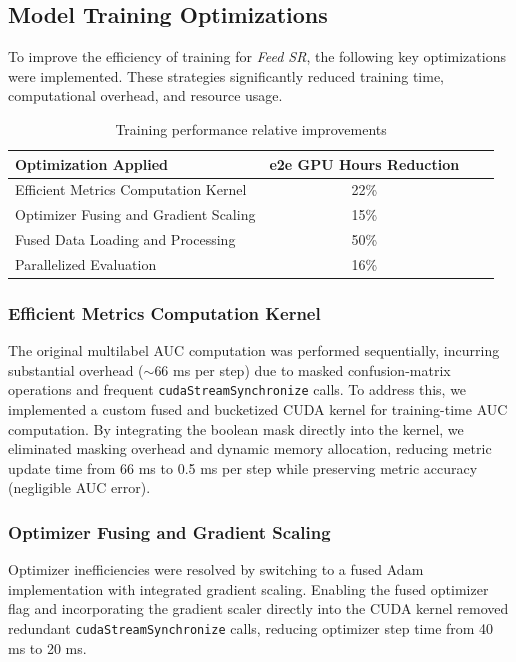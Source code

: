 \documentclass[sigconf]{acmart}
\newcommand{\systemname}{\textit{Feed SR}}
\begin{document}
\subsection{Model Training Optimizations}\label{sec:training-optimizations}

To improve the efficiency of training for {\systemname}, the following key optimizations were implemented. These strategies significantly reduced training time, computational overhead, and resource usage.

\begin{table}[ht]
\centering
\small %
\begin{tabular}{lccc}
\hline
\textbf{Optimization Applied} & \textbf{e2e GPU Hours Reduction}\\ \hline
Efficient Metrics Computation Kernel & 22\% \\
Optimizer Fusing and Gradient Scaling & 15\% \\ 
Fused Data Loading and Processing & 50\% \\ 
Parallelized Evaluation & 16\% \\ 
\hline
\end{tabular}
\caption{Training performance relative improvements}
\label{table:Training_optimizations_table}
\vspace{-2.5em}
\end{table}

\subsubsection{Efficient Metrics Computation Kernel}
The original multilabel AUC computation was performed sequentially, incurring substantial overhead ($\sim66$ ms per step) due to masked confusion-matrix operations and frequent \texttt{cudaStreamSynchronize} calls. To address this, we implemented a custom fused and bucketized CUDA kernel for training-time AUC computation. By integrating the boolean mask directly into the kernel, we eliminated masking overhead and dynamic memory allocation, reducing metric update time from 66 ms to 0.5 ms per step while preserving metric accuracy (negligible AUC error).

\subsubsection{Optimizer Fusing and Gradient Scaling}
Optimizer inefficiencies were resolved by switching to a fused Adam implementation with integrated gradient scaling. Enabling the fused optimizer flag and incorporating the gradient scaler directly into the CUDA kernel removed redundant \texttt{cudaStreamSynchronize} calls, reducing optimizer step time from 40 ms to 20 ms.
\end{document}
